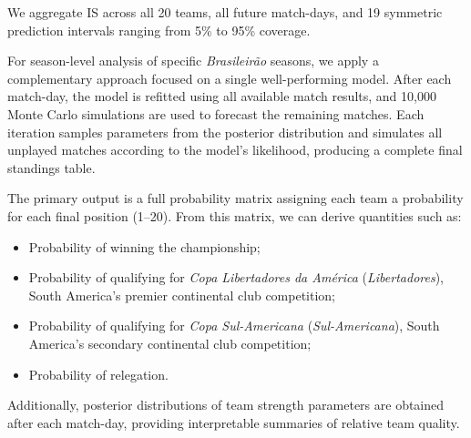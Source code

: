 We aggregate IS across all 20 teams, all future match-days, and 19 symmetric prediction intervals ranging from 5\% to 95\% coverage.

For season-level analysis of specific \textit{Brasileirão} seasons, we apply a complementary approach focused on a single well-performing model.
After each match-day, the model is refitted using all available match results, and 10,000 Monte Carlo simulations are used to forecast the remaining matches.
Each iteration samples parameters from the posterior distribution and simulates all unplayed matches according to the model's likelihood, producing a complete final standings table.

The primary output is a full probability matrix assigning each team a probability for each final position (1--20).
From this matrix, we can derive quantities such as:
\begin{itemize}
    \item Probability of winning the championship;
    \item Probability of qualifying for \textit{Copa Libertadores da América} (\textit{Libertadores}), South America's premier continental club competition;
    \item Probability of qualifying for \textit{Copa Sul-Americana} (\textit{Sul-Americana}), South America's secondary continental club competition;
    \item Probability of relegation.
\end{itemize}

Additionally, posterior distributions of team strength parameters are obtained after each match-day, providing interpretable summaries of relative team quality.
